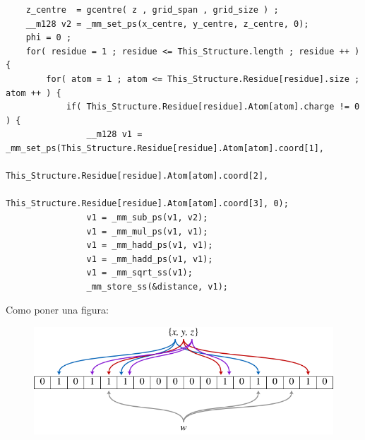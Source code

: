 \begin{lstlisting}
	z_centre  = gcentre( z , grid_span , grid_size ) ;
	__m128 v2 = _mm_set_ps(x_centre, y_centre, z_centre, 0);
	phi = 0 ;
	for( residue = 1 ; residue <= This_Structure.length ; residue ++ ) {
		for( atom = 1 ; atom <= This_Structure.Residue[residue].size ; atom ++ ) {
			if( This_Structure.Residue[residue].Atom[atom].charge != 0 ) {
				__m128 v1 = _mm_set_ps(This_Structure.Residue[residue].Atom[atom].coord[1],
						This_Structure.Residue[residue].Atom[atom].coord[2],
						This_Structure.Residue[residue].Atom[atom].coord[3], 0);
				v1 = _mm_sub_ps(v1, v2);
				v1 = _mm_mul_ps(v1, v1);
				v1 = _mm_hadd_ps(v1, v1);
				v1 = _mm_hadd_ps(v1, v1);
				v1 = _mm_sqrt_ss(v1);	
				_mm_store_ss(&distance, v1);
\end{lstlisting}

Como poner una figura:
\begin{figure}[ht]
   \centering
   \includegraphics[keepaspectratio=true,width=.6\textwidth]{figures/muestra}
\end{figure}

